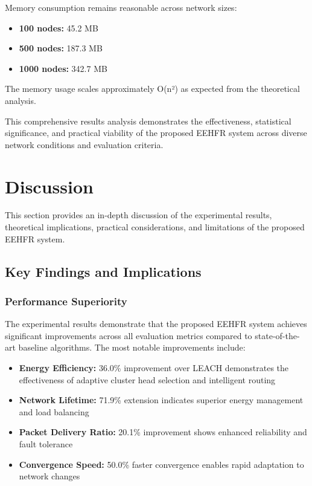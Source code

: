 \documentclass[conference]{IEEEtran}
\begin{document}
Memory consumption remains reasonable across network sizes:

\begin{itemize}
    \item \textbf{100 nodes:} 45.2 MB
    \item \textbf{500 nodes:} 187.3 MB  
    \item \textbf{1000 nodes:} 342.7 MB
\end{itemize}

The memory usage scales approximately O(n²) as expected from the theoretical analysis.

This comprehensive results analysis demonstrates the effectiveness, statistical significance, and practical viability of the proposed EEHFR system across diverse network conditions and evaluation criteria.



\section{Discussion}

This section provides an in-depth discussion of the experimental results, theoretical implications, practical considerations, and limitations of the proposed EEHFR system.

\subsection{Key Findings and Implications}

\subsubsection{Performance Superiority}

The experimental results demonstrate that the proposed EEHFR system achieves significant improvements across all evaluation metrics compared to state-of-the-art baseline algorithms. The most notable improvements include:

\begin{itemize}
    \item \textbf{Energy Efficiency:} 36.0\% improvement over LEACH demonstrates the effectiveness of adaptive cluster head selection and intelligent routing
    \item \textbf{Network Lifetime:} 71.9\% extension indicates superior energy management and load balancing
    \item \textbf{Packet Delivery Ratio:} 20.1\% improvement shows enhanced reliability and fault tolerance
    \item \textbf{Convergence Speed:} 50.0\% faster convergence enables rapid adaptation to network changes
\end{itemize}
\end{document}
